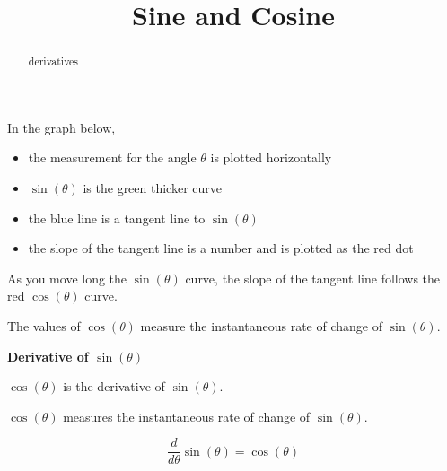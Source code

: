 \documentclass{ximera}
\title{Sine and Cosine}
\begin{document}
\begin{abstract}
derivatives
\end{abstract}
\maketitle








In the graph below, 

\begin{itemize}
\item the measurement for the angle $\theta$ is plotted horizontally
\item $\sin(\theta)$ is the green thicker curve
\item the blue line is a tangent line to $\sin(\theta)$
\item the slope of the tangent line is a number and is plotted as the red dot
\end{itemize}

As you move long the $\sin(\theta)$ curve, the slope of the tangent line follows the red $\cos(\theta)$ curve.








\begin{center}
\end{center}



The values of $\cos(\theta)$ measure the instantaneous rate of change of $\sin(\theta)$.



\begin{theorem}  \textbf{\textcolor{green!50!black}{Derivative of $\sin(\theta)$}}

\begin{center}
$\cos(\theta)$ is the derivative of $\sin(\theta)$.  

$\cos(\theta)$ measures the instantaneous rate of change of $\sin(\theta)$.  
\end{center}


\[
\frac{d}{d\theta} \sin(\theta) = \cos(\theta)
\]

\end{theorem}
\end{document}
